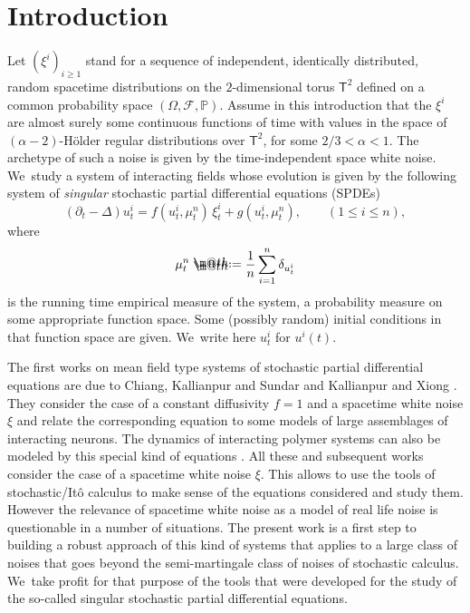 \documentclass[JEP,XML,SOM,Unicode,published]{cedram}
\makeatletter
\theoremstyle{definition}
\newcommand{\bsfT}{\mathbf{\mathsf{T}}}
\newcommand{\mcF}{\mathcal{F}}
\newcommand*{\defeq}{\mathrel{\rlap{%
\raisebox{0.3ex}{$\m@th\cdot$}}%
\raisebox{-0.3ex}{$\m@th\cdot$}}%
=}
\makeatother
\begin{document}
\section{Introduction}
\label{SectionIntro}

Let $(\xi^i)_{i\geq 1}$ stand for a sequence of independent, identically distributed, random spacetime distributions on the $2$-dimensional torus $\bsfT^2$ defined on a common probability space $(\Omega, \mcF, \mathbb{P})$. Assume in this introduction that the $\xi^i$ are almost surely some continuous functions of time with values in the space of $(\alpha-2)$-Hölder regular distributions over $\bsfT^2$, for some $2/3<\alpha<1$. The archetype of such a noise is given by the time-independent space white noise. We~study a system of interacting fields whose evolution is given by the following system of {\it singular} stochastic partial differential equations (SPDEs)\vspace*{-3pt}
\begin{equation} \label{EqMainSystem}
(\partial_t-\Delta)u^i_t = f(u^i_t,\mu_t^n)\,\xi_t^i + g(u^i_t,\mu_t^n), \qquad (1\leq i\leq n),
\end{equation}
where\vspace*{-6pt}\enlargethispage{\baselineskip}
\[
\mu_t^n \defeq \frac{1}{n}\sum_{i=1}^n\delta_{u^i_t}
\]
is the running time empirical measure of the system, a probability measure on some appropriate function space. Some (possibly random) initial conditions in that function space are given. We~write here $u_t^i$ for $u^i(t)$.

The first works on mean field type systems of stochastic partial differential equations are due to Chiang, Kallianpur and Sundar \cite{CKS} and Kallianpur and Xiong \cite{KX}. They consider the case of a constant diffusivity $f=1$ and a spacetime white noise $\xi$ and relate the corresponding equation to some models of large assemblages of interacting neurons. The dynamics of interacting polymer systems can also be modeled by this special kind of equations \cite{EShen, Criens}. All these and subsequent works consider the case of a spacetime white noise $\xi$. This allows to use the tools of stochastic/Itô calculus to make sense of the equations considered and study them. However the relevance of spacetime white noise as a model of real life noise is questionable in a number of situations. The present work is a first step to building a robust approach of this kind of systems that applies to a large class of noises that goes beyond the semi-martingale class of noises of stochastic calculus. We~take profit for that purpose of the tools that were developed for the study of the so-called singular stochastic partial differential equations.
\end{document}
